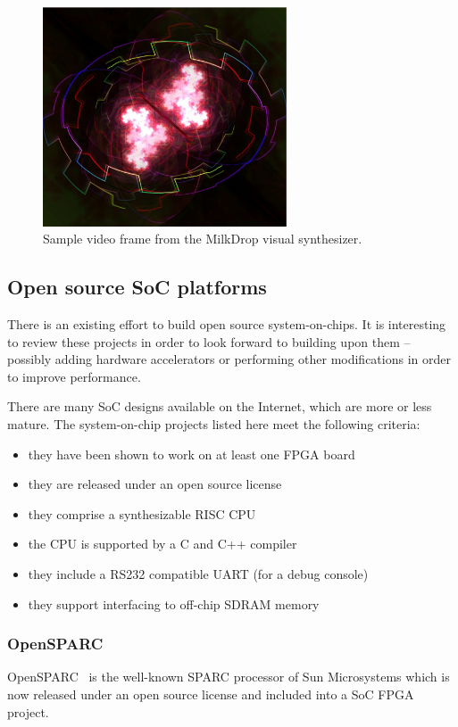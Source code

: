 \documentclass[a4paper,11pt]{kthesis}
\begin{document}
\begin{figure}[htp]
\centering
\includegraphics[height=65mm]{milkdrop2.eps}
\caption{Sample video frame from the MilkDrop visual synthesizer.}
\label{fig:milkdrop}
\end{figure}

\subsection{Open source SoC platforms}
There is an existing effort to build open source system-on-chips. It is interesting to review these projects in order to look forward to building upon them -- possibly adding hardware accelerators or performing other modifications in order to improve performance.

There are many SoC designs available on the Internet, which are more or less mature. The system-on-chip projects listed here meet the following criteria:
\begin{itemize}
\item they have been shown to work on at least one FPGA board
\item they are released under an open source license
\item they comprise a synthesizable RISC CPU
\item the CPU is supported by a C and C++ compiler
\item they include a RS232 compatible UART (for a debug console)
\item they support interfacing to off-chip SDRAM memory
\end{itemize}

\subsubsection{OpenSPARC}
OpenSPARC~\cite{opensparc} is the well-known SPARC processor of Sun Microsystems which is now released under an open source license and included into a SoC FPGA project.
\end{document}
